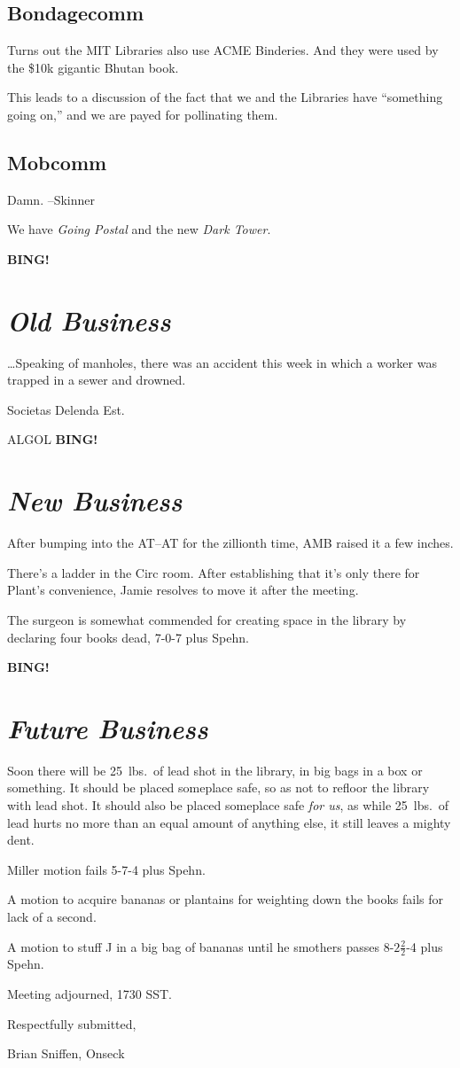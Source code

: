 \documentclass[10pt]{article}
\newcommand{\bing}{{\bf BING!} }
\newcommand{\goto}[1]{\bing \vskip 12pt \section*{{\em{#1}}}}
\newcommand{\ps}{ plus Spehn\xspace}
\begin{document}
\subsection*{Bondagecomm}
Turns out the MIT Libraries also use ACME Binderies.  And they were
used by the \$10k gigantic Bhutan book.

This leads to a discussion of the fact that we and the Libraries have
``something going on,'' and we are payed for pollinating them.

\subsection*{Mobcomm}
Damn. --Skinner

We have \emph{Going Postal} and the new \emph{Dark Tower}.

\goto{Old Business}

\dots Speaking of manholes, there was an accident this week in which a
worker was trapped in a sewer and drowned.

Societas Delenda Est.

ALGOL
\goto{New Business}

After bumping into the AT--AT for the zillionth time, AMB raised it a
few inches.

There's a ladder in the Circ room.  After establishing that it's only
there for Plant's convenience, Jamie resolves to move it after the
meeting.

The surgeon is somewhat commended for creating space in the library by
declaring four books dead, 7-0-7\ps.

\goto{Future Business}

Soon there will be 25~lbs.\ of lead shot in the library, in big bags
in a box or something.  It should be placed someplace safe, so as not
to refloor the library with lead shot.  It should also be placed
someplace safe \emph{for us}, as while 25~lbs.\ of lead hurts no more
than an equal amount of anything else, it still leaves a mighty dent.

Miller motion fails 5-7-4\ps.

A motion to acquire bananas or plantains for weighting down the books
fails for lack of a second.

A motion to stuff J in a big bag of bananas until he smothers passes
8-$2\frac{2}{2}$-4\ps.

\vspace{12pt}

\noindent
Meeting adjourned, 1730 SST.

\vspace{18pt}

\centerline{Respectfully submitted,}
\centerline{Brian Sniffen, Onseck}
\end{document}
